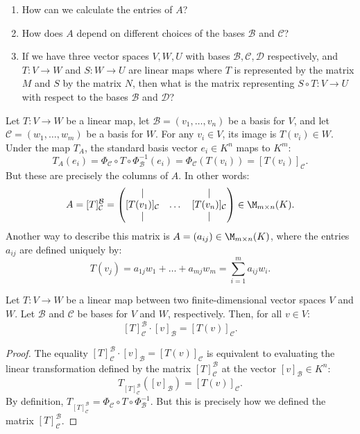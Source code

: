 \begin{question}
\begin{enumerate}
    \item How can we calculate the entries of $A$?
    \item How does $A$ depend on different choices of the bases $\mathcal{B}$ and $\mathcal{C}$?
    \item If we have three vector spaces $V, W, U$ with bases $\mathcal{B}, \mathcal{C}, \mathcal{D}$ respectively, and $T: V \to W$ and $S: W \to U$ are linear maps where $T$ is represented by the matrix $M$ and $S$ by the matrix $N$, then what is the matrix representing $S \circ T: V \to U$ with respect to the bases $\mathcal{B}$ and $\mathcal{D}$?
\end{enumerate}
\end{question}

Let $T: V \to W$ be a linear map, let $\mathcal{B} = (v_1, \dots, v_n)$ be a basis for $V$, and let $\mathcal{C} = (w_1, \dots, w_m)$ be a basis for $W$. For any $v_i \in V$, its image is $T(v_i) \in W$. Under the map $T_A$, the standard basis vector $e_i \in K^n$ maps to $K^m$:
\[
T_A(e_i) = \Phi_{\mathcal{C}} \circ T \circ \Phi_{\mathcal{B}}^{-1}(e_i) = \Phi_{\mathcal{C}}(T(v_i)) = [T(v_i)]_{\mathcal{C}}.
\]
But these are precisely the columns of $A$. In other words:
\[
A = [T]_{\mathcal{C}}^{\mathcal{B}} = 
\begin{pmatrix}
| & & | \\
[T(v_1)]_{\mathcal{C}} & \dots & [T(v_n)]_{\mathcal{C}} \\
| & & |
\end{pmatrix}
\in \M_{m \times n}(K).
\]
Another way to describe this matrix is $A = (a_{ij}) \in \M_{m \times n}(K)$, where the entries $a_{ij}$ are defined uniquely by:
\[
T(v_j) = a_{1j} w_1 + \dots + a_{mj} w_m = \sum_{i=1}^m a_{ij} w_i.
\]

\begin{proposition}
\label{prop:matrix_evaluation}
Let $T: V \to W$ be a linear map between two finite-di\-men\-sional vector spaces $V$ and $W$. Let $\mathcal{B}$ and $\mathcal{C}$ be bases for $V$ and $W$, respectively. Then, for all $v \in V$:
\[
[T]_{\mathcal{C}}^{\mathcal{B}} \cdot [v]_{\mathcal{B}} = [T(v)]_{\mathcal{C}}.
\]
\end{proposition}

\begin{proof}
The equality $[T]_{\mathcal{C}}^{\mathcal{B}} \cdot [v]_{\mathcal{B}} = [T(v)]_{\mathcal{C}}$ is equivalent to evaluating the linear transformation defined by the matrix $[T]_{\mathcal{C}}^{\mathcal{B}}$ at the vector $[v]_{\mathcal{B}} \in K^n$:
\[
T_{[T]_{\mathcal{C}}^{\mathcal{B}}}([v]_{\mathcal{B}}) = [T(v)]_{\mathcal{C}}.
\]
By definition, $T_{[T]_{\mathcal{C}}^{\mathcal{B}}} = \Phi_{\mathcal{C}} \circ T \circ \Phi_{\mathcal{B}}^{-1}$. But this is precisely how we defined the matrix $[T]_{\mathcal{C}}^{\mathcal{B}}$.
\end{proof}

